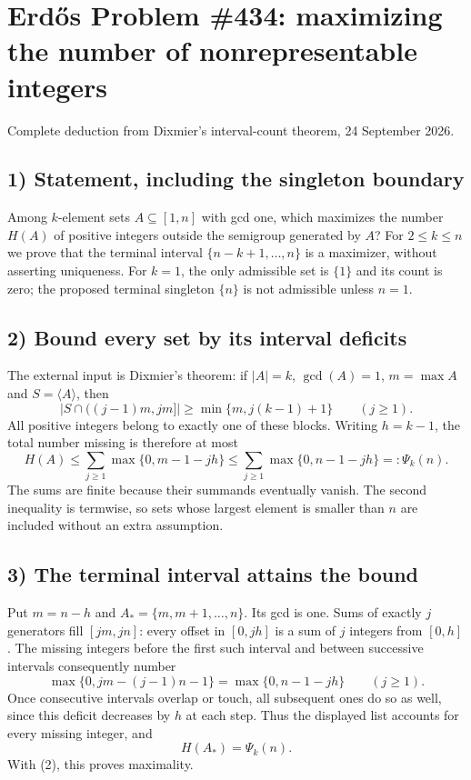 \section{Erd\H{o}s Problem \#434: maximizing the number of nonrepresentable integers}
\noindent Complete deduction from Dixmier's interval-count theorem, 24 September 2026.

\subsection*{1) Statement, including the singleton boundary}
Among $k$-element sets $A\subseteq[1,n]$ with gcd one, which maximizes the number $H(A)$ of positive integers outside the semigroup generated by $A$? For $2\le k\le n$ we prove that the terminal interval $\{n-k+1,\ldots,n\}$ is a maximizer, without asserting uniqueness. For $k=1$, the only admissible set is $\{1\}$ and its count is zero; the proposed terminal singleton $\{n\}$ is not admissible unless $n=1$.

\subsection*{2) Bound every set by its interval deficits}
The external input is Dixmier's theorem: if $|A|=k$, $\gcd(A)=1$, $m=\max A$ and $S=\langle A\rangle$, then
\[|S\cap((j-1)m,jm]|\ge\min\{m,j(k-1)+1\}\qquad(j\ge1).
\tag{1}\]
All positive integers belong to exactly one of these blocks. Writing $h=k-1$, the total number missing is therefore at most
\[H(A)\le\sum_{j\ge1}\max\{0,m-1-jh\}\le\sum_{j\ge1}\max\{0,n-1-jh\}=:\Psi_k(n).
\tag{2}\]
The sums are finite because their summands eventually vanish. The second inequality is termwise, so sets whose largest element is smaller than $n$ are included without an extra assumption.

\subsection*{3) The terminal interval attains the bound}
Put $m=n-h$ and $A_*=\{m,m+1,\ldots,n\}$. Its gcd is one. Sums of exactly $j$ generators fill $[jm,jn]$: every offset in $[0,jh]$ is a sum of $j$ integers from $[0,h]$. The missing integers before the first such interval and between successive intervals consequently number
\[\max\{0,jm-(j-1)n-1\}=\max\{0,n-1-jh\}\qquad(j\ge1).
\]
Once consecutive intervals overlap or touch, all subsequent ones do so as well, since this deficit decreases by $h$ at each step. Thus the displayed list accounts for every missing integer, and
\[H(A_*)=\Psi_k(n).
\]
With (2), this proves maximality.

